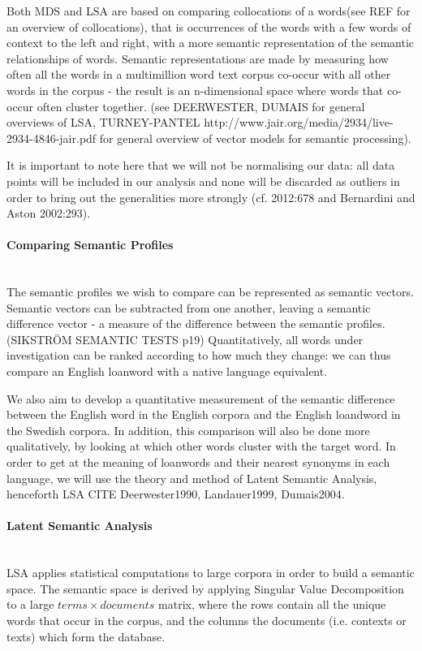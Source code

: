 \documentclass[a4paper]{article}
\begin{document}
Both MDS and LSA are based on comparing collocations of a words(see REF for an overview of collocations), that is occurrences of the words with a few words of context to the left and right, with a more semantic representation of the semantic relationships of words. Semantic representations are made by measuring how often all the words in a multimillion word text corpus co-occur with all other words in the corpus - the result is an n-dimensional space where words that co-occur often cluster together. (see DEERWESTER, DUMAIS for general overviews of LSA, TURNEY-PANTEL http://www.jair.org/media/2934/live-2934-4846-jair.pdf for general overview of vector models for semantic processing).

It is important to note here that we will not be normalising our data: all data points will be included in our analysis and none will be discarded as outliers in order to bring out the generalities more strongly (cf. \cite{Walchli2012} 2012:678 and Bernardini and Aston 2002:293).

\paragraph{Comparing Semantic Profiles} \hspace{0pt} \\
The semantic profiles we wish to compare can be represented as semantic vectors. Semantic vectors can be subtracted from one another, leaving a semantic difference vector - a measure of the difference between the semantic profiles.(SIKSTRÖM SEMANTIC TESTS p19) Quantitatively, all words under investigation can be ranked according to how much they change: we can thus compare an English loanword with a native language equivalent. 

We also aim to develop a quantitative measurement of the semantic difference between the English word in the English corpora and the English loandword in the Swedish corpora. In addition, this comparison will also be done more qualitatively, by looking at which other words cluster with the target word. 
In order to get at the meaning of loanwords and their nearest synonyms in each language, we will use the theory and method of Latent Semantic Analysis, henceforth LSA CITE {Deerwester1990, Landauer1999, Dumais2004}.

\paragraph{Latent Semantic Analysis} \hspace{0pt} \\
LSA applies statistical computations to large corpora in order to build a semantic space.
The semantic space is derived by applying Singular Value Decomposition to a large $ terms \times documents$ matrix, where the rows contain all the unique words that occur in the corpus, and the columns the documents (i.e. contexts or texts) which form the database.
\end{document}
